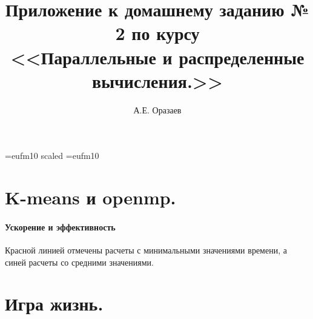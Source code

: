 \documentclass[12pt]{article}
\title{\bf Приложение к домашнему заданию № 2 по курсу \\ <<Параллельные
и распределенные вычисления.>>}
\author{А.Е. Оразаев}
\date{}
\begin{document}
\voffset=-20mm
\hoffset=-12mm
\font\Got=eufm10 scaled \font\Got=eufm10

\maketitle

\section{K-means и openmp.}
\paragraph{Ускорение и эффективность}
\begin{center}
\end{center}
Красной линией отмечены расчеты с минимальными значениями времени, а синей
расчеты со средними значениями.

\section{Игра жизнь.}
\end{document}
